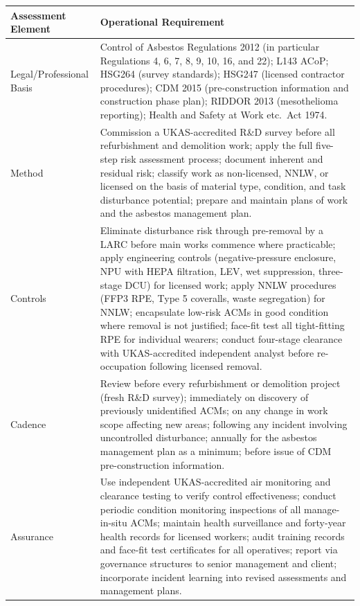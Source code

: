 \begin{table}[H]
\centering
\begin{tabularx}{\textwidth}{>{\raggedright\arraybackslash}p{3.2cm}X}
\toprule
\textbf{Assessment Element} & \textbf{Operational Requirement} \\
\midrule
Legal/Professional Basis & Control of Asbestos Regulations 2012 (in particular Regulations 4, 6, 7, 8, 9, 10, 16, and 22); L143 ACoP; HSG264 (survey standards); HSG247 (licensed contractor procedures); CDM 2015 (pre-construction information and construction phase plan); RIDDOR 2013 (mesothelioma reporting); Health and Safety at Work etc.\ Act 1974. \\
Method & Commission a UKAS-accredited R\&D survey before all refurbishment and demolition work; apply the full five-step risk assessment process; document inherent and residual risk; classify work as non-licensed, NNLW, or licensed on the basis of material type, condition, and task disturbance potential; prepare and maintain plans of work and the asbestos management plan. \\
Controls & Eliminate disturbance risk through pre-removal by a LARC before main works commence where practicable; apply engineering controls (negative-pressure enclosure, NPU with HEPA filtration, LEV, wet suppression, three-stage DCU) for licensed work; apply NNLW procedures (FFP3 RPE, Type 5 coveralls, waste segregation) for NNLW; encapsulate low-risk ACMs in good condition where removal is not justified; face-fit test all tight-fitting RPE for individual wearers; conduct four-stage clearance with UKAS-accredited independent analyst before re-occupation following licensed removal. \\
Cadence & Review before every refurbishment or demolition project (fresh R\&D survey); immediately on discovery of previously unidentified ACMs; on any change in work scope affecting new areas; following any incident involving uncontrolled disturbance; annually for the asbestos management plan as a minimum; before issue of CDM pre-construction information. \\
Assurance & Use independent UKAS-accredited air monitoring and clearance testing to verify control effectiveness; conduct periodic condition monitoring inspections of all manage-in-situ ACMs; maintain health surveillance and forty-year health records for licensed workers; audit training records and face-fit test certificates for all operatives; report via governance structures to senior management and client; incorporate incident learning into revised assessments and management plans. \\
\bottomrule
\end{tabularx}
\end{table}

